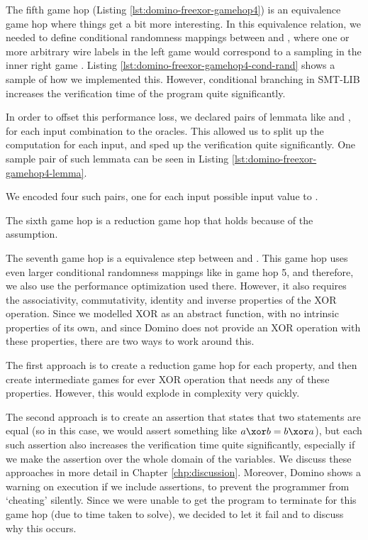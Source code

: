 
The fifth game hop (Listing \ref{lst:domino-freexor-gamehop4}) is an equivalence game hop where things get a bit more interesting. In this equivalence relation, we needed to define conditional randomness mappings between  and  , where one or more arbitrary wire labels in the left game would correspond to a sampling in the inner right game .
Listing \ref{lst:domino-freexor-gamehop4-cond-rand} shows a sample of how we implemented this. However, conditional branching in SMT-LIB increases the verification time of the program quite significantly.



In order to offset this performance loss, we declared pairs of lemmata like  and , for each input combination to the  oracles. This allowed us to split up the computation for each input, and sped up the verification quite significantly. One sample pair of such lemmata can be seen in Listing \ref{lst:domino-freexor-gamehop4-lemma}.

We encoded four such pairs, one for each input possible input value to .


The sixth game hop is a reduction game hop that holds because of the  assumption.  


The seventh game hop is a equivalence step between   and . This game hop uses even larger conditional randomness mappings like in game hop 5, and therefore, we also use the performance optimization used there. However, it also requires the associativity, commutativity, identity and inverse properties of the XOR operation. Since we modelled XOR as an abstract function, with no intrinsic properties of its own, and since Domino does not provide an XOR operation with these properties, there are two ways to work around this. 

The first approach is to create a reduction game hop for each property, and then create intermediate games for ever XOR operation that needs any of these properties. However, this would explode in complexity very quickly.

The second approach is to create an assertion that states that two statements are equal (so in this case, we would assert something like $a\xor b = b \xor a$), but each such assertion also increases the verification time quite significantly, especially if we make the assertion over the whole domain of the variables. We discuss these approaches in more detail in Chapter \ref{chp:discussion}. Moreover, Domino shows a warning on execution if we include assertions, to prevent the programmer from `cheating' silently. Since we were unable to get the program to terminate for this game hop (due to time taken to solve), we decided to let it fail and to discuss why this occurs.

